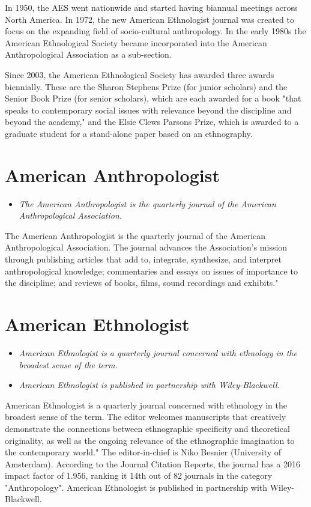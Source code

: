 In 1950, the AES went nationwide and started having biannual meetings
across North America. In 1972, the new American Ethnologist journal was
created to focus on the expanding field of socio-cultural anthropology.
In the early 1980s the American Ethnological Society became incorporated
into the American Anthropological Association as a sub-section.

Since 2003, the American Ethnological Society has awarded three awards
biennially. These are the Sharon Stephens Prize (for junior scholars)
and the Senior Book Prize (for senior scholars), which are each awarded
for a book "that speaks to contemporary social issues with relevance
beyond the discipline and beyond the academy," and the Elsie Clews
Parsons Prize, which is awarded to a graduate student for a stand-alone
paper based on an ethnography.

\section{American Anthropologist}\label{american-anthropologist}

\begin{itemize}
\item
  \emph{The American Anthropologist is the quarterly journal of the
  American Anthropological Association.}
\end{itemize}

The American Anthropologist is the quarterly journal of the American
Anthropological Association. The journal advances the Association's
mission through publishing articles that add to, integrate, synthesize,
and interpret anthropological knowledge; commentaries and essays on
issues of importance to the discipline; and reviews of books, films,
sound recordings and exhibits."

\section{American Ethnologist}\label{american-ethnologist}

\begin{itemize}
\item
  \emph{American Ethnologist is a quarterly journal concerned with
  ethnology in the broadest sense of the term.}
\item
  \emph{American Ethnologist is published in partnership with
  Wiley-Blackwell.}
\end{itemize}

American Ethnologist is a quarterly journal concerned with ethnology in
the broadest sense of the term. The editor welcomes manuscripts that
creatively demonstrate the connections between ethnographic specificity
and theoretical originality, as well as the ongoing relevance of the
ethnographic imagination to the contemporary world." The editor-in-chief
is Niko Besnier (University of Amsterdam). According to the Journal
Citation Reports, the journal has a 2016 impact factor of 1.956, ranking
it 14th out of 82 journals in the category "Anthropology". American
Ethnologist is published in partnership with Wiley-Blackwell.

